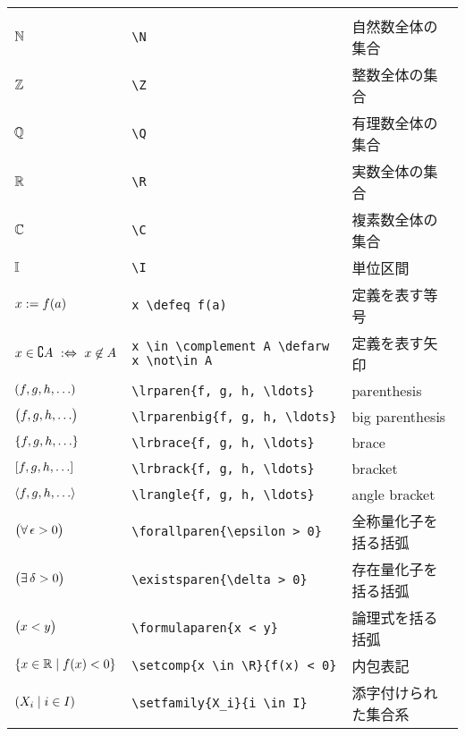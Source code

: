 \documentclass[uplatex, dvipdfmx, 12pt, crop=false]{standalone}
\begin{document}
\begin{table}[htb]
\begin{tabular}{ll@{\qquad}l}
		\tablesubtitle{基礎的な数式記号} \\
		$\mathbb{N}$                                      & \verb|\N|                                      & 自然数全体の集合     \\
		$\mathbb{Z}$                                      & \verb|\Z|                                      & 整数全体の集合       \\
		$\mathbb{Q}$                                      & \verb|\Q|                                      & 有理数全体の集合     \\
		$\mathbb{R}$                                      & \verb|\R|                                      & 実数全体の集合       \\
		$\mathbb{C}$                                      & \verb|\C|                                      & 複素数全体の集合     \\
		$\mathbb{I}$                                      & \verb|\I|                                      & 単位区間             \\
		$x \mathrel{:=} f(a)$                           & \verb|x \defeq f(a)|                           & 定義を表す等号       \\
		$x \in \complement A \mathrel{\ :\Leftrightarrow\ } x \not\in A$ & \verb|x \in \complement A \defarw x \not\in A| & 定義を表す矢印       \\
		$\lrparen{f, g, h, \ldots}$               & \verb|\lrparen{f, g, h, \ldots}|               & parenthesis          \\
		$\bigl({f, g, h, \ldots}\bigr)$            & \verb|\lrparenbig{f, g, h, \ldots}|            & big parenthesis      \\
		$\lrbrace{f, g, h, \ldots}$               & \verb|\lrbrace{f, g, h, \ldots}|               & brace                \\
		$\lrbrack{f, g, h, \ldots}$               & \verb|\lrbrack{f, g, h, \ldots}|               & bracket              \\
		$\lrangle{f, g, h, \ldots}$               & \verb|\lrangle{f, g, h, \ldots}|               & angle bracket        \\
		$\bigl({\forall\, \epsilon > 0}\bigr)$              & \verb|\forallparen{\epsilon > 0}|              & 全称量化子を括る括弧 \\
		$\bigl({\exists\, \delta > 0}\bigr)$                & \verb|\existsparen{\delta > 0}|                & 存在量化子を括る括弧 \\
		$\bigl({x < y}\bigr)$                    & \verb|\formulaparen{x < y}|                    & 論理式を括る括弧     \\
		$\setcomp{x \in \R}{f(x) < 0}$            & \verb|\setcomp{x \in \R}{f(x) < 0}|            & 内包表記             \\
		$\setfamily{X_i}{i \in I}$                & \verb|\setfamily{X_i}{i \in I}|                & 添字付けられた集合系 \\
		\hline


\end{tabular}
\end{table}
\end{document}
